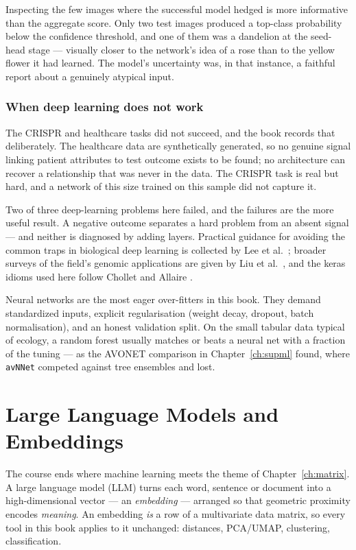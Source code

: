 \documentclass[11pt,oneside]{book}
\newcommand{\code}[1]{\texttt{#1}}
\newcommand{\pkg}[1]{\textsf{#1}}
\begin{document}
Inspecting the few images where the successful model hedged is more informative than the
aggregate score. Only two test images produced a top-class probability below the
confidence threshold, and one of them was a dandelion at the seed-head stage — visually
closer to the network's idea of a rose than to the yellow flower it had learned. The model's
uncertainty was, in that instance, a faithful report about a genuinely atypical input.

\subsection{When deep learning does not work}
The CRISPR and healthcare tasks did not succeed, and the book records that deliberately.
The healthcare data are synthetically generated, so no genuine signal linking patient
attributes to test outcome exists to be found; no architecture can recover a relationship
that was never in the data. The CRISPR task is real but hard, and a network of this size
trained on this sample did not capture it.

\begin{keybox}
Two of three deep-learning problems here failed, and the failures are the more useful
result. A negative outcome separates a hard problem from an absent signal — and neither is
diagnosed by adding layers. Practical guidance for avoiding the common traps in biological
deep learning is collected by Lee et al.\ \cite{Lee_2022}; broader surveys of the field's
genomic applications are given by Liu et al.\ \cite{Liu_2020}, and the \pkg{keras} idioms
used here follow Chollet and Allaire \cite{Allaire_2018}.
\end{keybox}

\begin{pitfall}
Neural networks are the most eager over-fitters in this book. They demand standardized
inputs, explicit regularisation (weight decay, dropout, batch normalisation), and an honest
validation split. On the small tabular data typical of ecology, a random forest usually
matches or beats a neural net with a fraction of the tuning — as the AVONET comparison in
Chapter~\ref{ch:supml} found, where \code{avNNet} competed against tree ensembles and lost.
\end{pitfall}

\chapter{Large Language Models and Embeddings}
\label{ch:llm}
The course ends where machine learning meets the theme of Chapter~\ref{ch:matrix}. A large language
model (LLM) turns each word, sentence or document into a high-dimensional vector — an
\emph{embedding} — arranged so that geometric proximity encodes \emph{meaning}. An
embedding \emph{is} a row of a multivariate data matrix, so every tool in this book
applies to it unchanged: distances, PCA/UMAP, clustering, classification.
\end{document}
